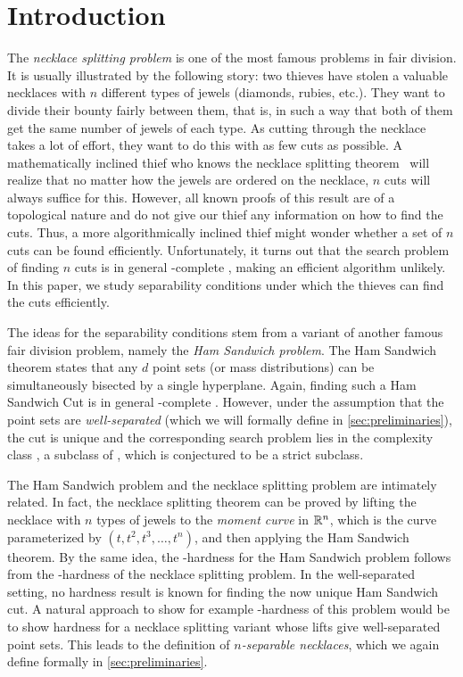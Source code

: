 \documentclass[a4paper,UKenglish,cleveref, thm-restate]{lipics-v2021}
\begin{document}
\section{Introduction}
The \emph{necklace splitting problem} is one of the most famous problems in fair division.
It is usually illustrated by the following story: two thieves have stolen a valuable necklaces with $n$ different types of jewels (diamonds, rubies, etc.).
They want to divide their bounty fairly between them, that is, in such a way that both of them get the same number of jewels of each type.
As cutting through the necklace takes a lot of effort, they want to do this with as few cuts as possible.
A mathematically inclined thief who knows the necklace splitting theorem~\cite{alonSplitting, AlonWest, GoldbergWest} will realize that no matter how the jewels are ordered on the necklace, $n$ cuts will always suffice for this.
However, all known proofs of this result are of a topological nature and do not give our thief any information on how to find the cuts.
Thus, a more algorithmically inclined thief might wonder whether a set of $n$ cuts can be found efficiently.
Unfortunately, it turns out that the search problem of finding $n$ cuts is in general \PPA-complete \cite{HamSandwichPPAComplete}, making an efficient algorithm unlikely.
In this paper, we study separability conditions under which the thieves can find the cuts efficiently.

The ideas for the separability conditions stem from a variant of another famous fair division problem, namely the \emph{Ham Sandwich problem}.
The Ham Sandwich theorem \cite{HS} states that any $d$ point sets (or mass distributions) can be simultaneously bisected by a single hyperplane.
Again, finding such a Ham Sandwich Cut is in general \PPA-complete \cite{HamSandwichPPAComplete}.
However, under the assumption that the point sets are \emph{well-separated} (which we will formally define in \cref{sec:preliminaries}), the cut is unique \cite{originalDiscreteAlphaHS} and the corresponding search problem lies in the complexity class \UEOPL \cite{aHSinUEOPL}, a subclass of \PPA, which is conjectured to be a strict subclass.

The Ham Sandwich problem and the necklace splitting problem are intimately related.
In fact, the necklace splitting theorem can be proved by lifting the necklace with $n$ types of jewels to the \emph{moment curve} in $\mathbb{R}^n$, which is the curve parameterized by $(t,t^2,t^3,\ldots,t^n)$, and then applying the Ham Sandwich theorem.
By the same idea, the \PPA-hardness for the Ham Sandwich problem follows from the \PPA-hardness of the necklace splitting problem.
In the well-separated setting, no hardness result is known for finding the now unique Ham Sandwich cut.
A natural approach to show for example \UEOPL-hardness of this problem would be to show hardness for a necklace splitting variant whose lifts give well-separated point sets.
This leads to the definition of \emph{$n$-separable necklaces}, which we again define formally in \cref{sec:preliminaries}.
\end{document}
